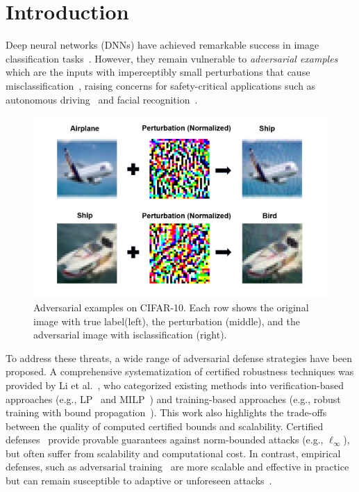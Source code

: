 \chapter{Introduction}

\indent
Deep neural networks (DNNs) have achieved remarkable success in image classification tasks~\cite{he2016deep, krizhevsky2012imagenet}. However, they remain vulnerable to \emph{adversarial examples} which are the inputs with imperceptibly small perturbations that cause misclassification~\cite{szegedy2013intriguing, goodfellow2014explaining}, raising concerns for safety-critical applications such as autonomous driving~\cite{Eykholt_2018_CVPR} and facial recognition~\cite{sharif2016accessorize}.

\begin{figure}[htbp]
    \centering
    \includegraphics[width=0.85\linewidth]{images/Adversarial examples.png}
    \caption{Adversarial examples on CIFAR-10. Each row shows the original image with true label(left), the perturbation (middle), and the adversarial image with isclassification (right).}

    \label{fig:adv_examples}
\end{figure}

To address these threats, a wide range of adversarial defense strategies have been proposed. A comprehensive systematization of certified robustness techniques was provided by Li et al.~\cite{li2023sok}, who categorized existing methods into verification-based approaches (e.g., LP~\cite{wong2018provable} and MILP~\cite{tjeng2017evaluating}) and training-based approaches (e.g., robust training with bound propagation~\cite{gowal2018effectiveness}). This work also highlights the trade-offs between the quality of computed certified bounds and scalability. 
Certified defenses~\cite{cohen2019certified, gowal2018effectiveness} provide provable guarantees against norm-bounded attacks (e.g., $\ell_\infty$), but often suffer from scalability and computational cost. In contrast, empirical defenses, such as adversarial training~\cite{madry2017towards, wong2020fast} are more scalable and effective in practice but can remain susceptible to adaptive or unforeseen attacks~\cite{tramer2020adaptive}.


